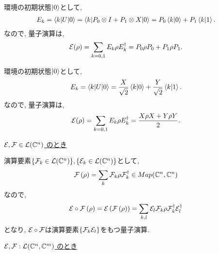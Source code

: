 \begin{ex}
    \label{ex8.4}
    環境の初期状態$\ket{0}$として,
    \begin{align*}
        E_k
        = \braket{k | U | 0}
        = \braket{k | P_0 \otimes I + P_1 \otimes X | 0}
        = P_0 \braket{k|0} + P_1 \braket{k|1}.
    \end{align*}
    なので, 量子演算は,
    \begin{align*}
        \mathcal{E} (\rho)
        = \sum_{k = 0, 1} E_k \rho E_k^\dagger
        = P_0 \rho P_0 + P_1 \rho P_1.
    \end{align*}
\end{ex}

\begin{ex}
    \label{ex8.5}
    環境の初期状態$\ket{0}$として,
    \begin{align*}
        E_k
        = \braket{k | U | 0}
        = \frac{X}{\sqrt{2}} \braket{k|0} + \frac{Y}{\sqrt{2}} \braket{k|1}.
    \end{align*}
    なので, 量子演算は,
    \begin{align*}
        \mathcal{E} (\rho)
        = \sum_{k = 0, 1} E_k \rho E_k^\dagger
        = \frac{X \rho X + Y \rho Y}{2}.
    \end{align*}
\end{ex}

\begin{ex}
    \label{ex8.6}
    \par
    \underline{
        $\mathcal{E}, \mathcal{F} \in \mathcal{L}(\mathbb{C}^n)$
        のとき
    }
    \par
    演算要素$\{\mathcal{F}_k \in \mathcal{L}(\mathbb{C}^n)\}, \{\mathcal{E}_k \in \mathcal{L}(\mathbb{C}^n)\}$として,
    \begin{align*}
        \mathcal{F} \left( \rho \right) = \sum_k \mathcal{F}_k \rho \mathcal{F}_k^\dagger \in Map(\mathbb{C}^n, \mathbb{C}^n)
    \end{align*}
    なので,
    \begin{align*}
        \mathcal{E} \circ \mathcal{F} \left( \rho \right)
        =
        \mathcal{E} \left( \mathcal{F} \left( \rho \right) \right)
        =
        \sum_{k, l} \mathcal{E}_l \mathcal{F}_k \rho \mathcal{F}_k^\dagger \mathcal{E}_l^\dagger
    \end{align*}
    となり, $\mathcal{E} \circ \mathcal{F}$は演算要素$\{ \mathcal{F}_k \mathcal{E}_l \}$をもつ量子演算.
    \par
    \underline{
        $\mathcal{E}, \mathcal{F} :
            \mathcal{L}(\mathbb{C}^n, \mathbb{C}^m)$
        のとき
    }
    \par

\end{ex}

